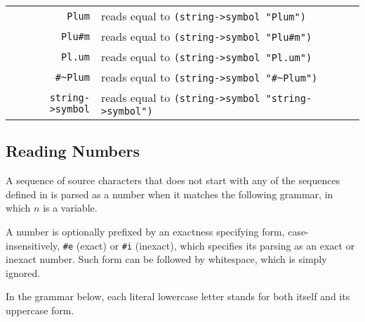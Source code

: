 \begin{tabular}{ r l }
  \lstinline!Plum! & reads equal to \lstinline!(string->symbol "Plum")! \\
  \lstinline!Plu#m! & reads equal to \lstinline!(string->symbol "Plu#m")! \\
  \lstinline!Pl.um! & reads equal to \lstinline!(string->symbol "Pl.um")! \\
  \lstinline!#~Plum! & reads equal to \lstinline!(string->symbol "#~Plum")! \\
  \lstinline!string->symbol! & reads equal to \lstinline!(string->symbol "string->symbol")! \\
\end{tabular}




\subsection{Reading Numbers}
\label{subsec:aml-base-lang-reader-numbers}

A sequence of source characters that does not start with any of the sequences defined in  is parsed as a number when it matches the following grammar, in which $n$ is a variable.

A number is optionally prefixed by an exactness specifying form, case-insensitively, \lstinline!#e! (exact) or \lstinline!#i! (inexact), which specifies its parsing as an exact or inexact number. Such form can be followed by whitespace, which is simply ignored.


In the grammar below, each literal lowercase letter stands for both itself and its uppercase form.


